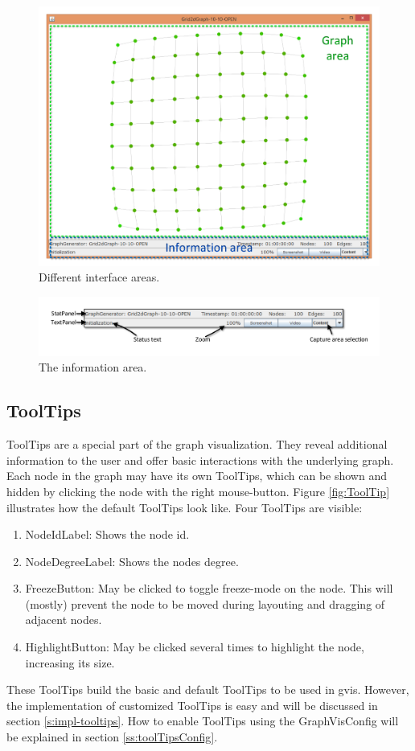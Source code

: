\begin{figure} [h]
\centering
\includegraphics [scale=0.45] {images/ui-areas.pdf}
\caption{Different interface areas.}
\label{ex:ui-areas}
\end{figure}
\begin{figure} [h]
\centering
\includegraphics [scale=0.6] {images/ui-information.pdf}
\caption{The information area.}
\label{ex:ui-information}
\end{figure}


\subsection{ToolTips}
\label{ss:toolTips}
ToolTips are a special part of the graph visualization. They reveal additional information to the user and offer basic interactions with the underlying graph. Each node in the graph may have its own ToolTips, which can be shown and hidden by clicking the node with the right mouse-button. Figure \ref{fig:ToolTip} illustrates how the default ToolTips look like. Four ToolTips are visible: 
\begin{enumerate}
\item NodeIdLabel: Shows the node id.
\item NodeDegreeLabel: Shows the nodes degree.
\item FreezeButton: May be clicked to toggle freeze-mode on the node. This will (mostly) prevent the node to be moved during layouting and dragging of adjacent nodes.
\item HighlightButton: May be clicked several times to highlight the node, increasing its size.
\end{enumerate}
These ToolTips build the basic and default ToolTips to be used in gvis. However, the implementation of customized ToolTips is easy and will be discussed in section \ref{s:impl-tooltips}. How to enable ToolTips using the GraphVisConfig will be explained in section \ref{ss:toolTipsConfig}.

